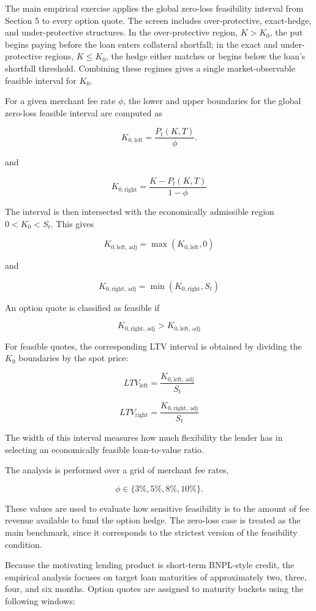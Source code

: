 \documentclass[11pt]{article}
\begin{document}
The main empirical exercise applies the global zero-loss feasibility interval from Section 5 to every option quote. The screen includes over-protective, exact-hedge, and under-protective structures. In the over-protective region, $K>K_0$, the put begins paying before the loan enters collateral shortfall; in the exact and under-protective regions, $K\le K_0$, the hedge either matches or begins below the loan’s shortfall threshold. Combining these regimes gives a single market-observable feasible interval for $K_0$.

For a given merchant fee rate $\phi$, the lower and upper boundaries for the global zero-loss feasible interval are computed as

$$
K_{0,\text{left}}
=
\frac{P_t(K,T)}{\phi}.
$$

and

$$
K_{0,\text{right}}
=
\frac{K-P_t(K,T)}{1-\phi}
$$

The interval is then intersected with the economically admissible region $0<K_0<S_t$. This gives

$$
K_{0, \text{left, adj}} = \max(K_{0, \text{left}}, 0)
$$

and

$$
K_{0, \text{right, adj}} = \min(K_{0, \text{right}}, S_t)
$$

An option quote is classified as feasible if

$$
K_{0, \text{right, adj}} >
K_{0, \text{left, adj}}
$$

For feasible quotes, the corresponding LTV interval is obtained by dividing the $K_0$ boundaries by the spot price:

$$
LTV_{\text{left}} = 
\frac{K_{0, \text{left, adj}}}{S_t}
$$

$$
LTV_{\text{right}} = 
\frac{K_{0, \text{right, adj}}}{S_t}
$$

The width of this interval measures how much flexibility the lender has in selecting an economically feasible loan-to-value ratio.

The analysis is performed over a grid of merchant fee rates,

$$
\phi \in \{3\%, 5\%, 8\%, 10\% \}.
$$

These values are used to evaluate how sensitive feasibility is to the amount of fee revenue available to fund the option hedge. The zero-loss case is treated as the main benchmark, since it corresponds to the strictest version of the feasibility condition.

Because the motivating lending product is short-term BNPL-style credit, the empirical analysis focuses on target loan maturities of approximately two, three, four, and six months. Option quotes are assigned to maturity buckets using the following windows:
\end{document}
